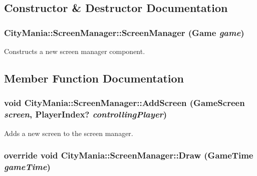 \subsection{Constructor \& Destructor Documentation}
\hypertarget{classCityMania_1_1ScreenManager_a00387669cce528d14b1cde5e4cd4caa6}{
\subsubsection[{ScreenManager}]{\setlength{\rightskip}{0pt plus 5cm}CityMania::ScreenManager::ScreenManager (Game {\em game})}}
\label{classCityMania_1_1ScreenManager_a00387669cce528d14b1cde5e4cd4caa6}


Constructs a new screen manager component. 

\subsection{Member Function Documentation}
\hypertarget{classCityMania_1_1ScreenManager_ab7b3df632a850c02161d23308d02bfc3}{
\subsubsection[{AddScreen}]{\setlength{\rightskip}{0pt plus 5cm}void CityMania::ScreenManager::AddScreen ({\bf GameScreen} {\em screen}, \/  PlayerIndex? {\em controllingPlayer})}}
\label{classCityMania_1_1ScreenManager_ab7b3df632a850c02161d23308d02bfc3}


Adds a new screen to the screen manager. \hypertarget{classCityMania_1_1ScreenManager_a6042d9cee57a4285dbd7d84ba0e55171}{
\subsubsection[{Draw}]{\setlength{\rightskip}{0pt plus 5cm}override void CityMania::ScreenManager::Draw (GameTime {\em gameTime})}}
\label{classCityMania_1_1ScreenManager_a6042d9cee57a4285dbd7d84ba0e55171}


